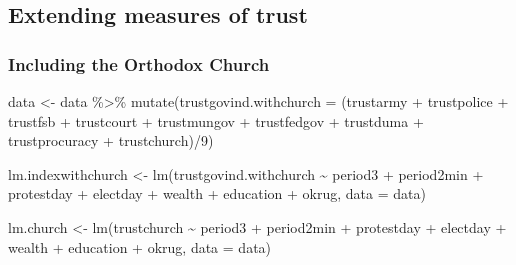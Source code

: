 \documentclass[
  letterpaper,
  DIV=11,
  numbers=noendperiod]{scrartcl}
\newenvironment{Shaded}{\begin{snugshade}}{\end{snugshade}}
\newcommand{\AttributeTok}[1]{\textcolor[rgb]{0.40,0.45,0.13}{#1}}
\newcommand{\DecValTok}[1]{\textcolor[rgb]{0.68,0.00,0.00}{#1}}
\newcommand{\FunctionTok}[1]{\textcolor[rgb]{0.28,0.35,0.67}{#1}}
\newcommand{\NormalTok}[1]{\textcolor[rgb]{0.00,0.23,0.31}{#1}}
\newcommand{\OtherTok}[1]{\textcolor[rgb]{0.00,0.23,0.31}{#1}}
\newcommand{\SpecialCharTok}[1]{\textcolor[rgb]{0.37,0.37,0.37}{#1}}
\begin{document}
\subsection{Extending measures of
trust}\label{extending-measures-of-trust}

\subsubsection{Including the Orthodox
Church}\label{including-the-orthodox-church}

\begin{Shaded}
\begin{Highlighting}[]
\NormalTok{data }\OtherTok{\textless{}{-}}\NormalTok{ data }\SpecialCharTok{\%\textgreater{}\%} 
  \FunctionTok{mutate}\NormalTok{(}\AttributeTok{trustgovind.withchurch =}\NormalTok{ (trustarmy }\SpecialCharTok{+}\NormalTok{ trustpolice }\SpecialCharTok{+}\NormalTok{ trustfsb }\SpecialCharTok{+}\NormalTok{ trustcourt }\SpecialCharTok{+} 
\NormalTok{                          trustmungov }\SpecialCharTok{+}\NormalTok{ trustfedgov }\SpecialCharTok{+}\NormalTok{ trustduma }\SpecialCharTok{+}\NormalTok{ trustprocuracy }\SpecialCharTok{+}
\NormalTok{                            trustchurch)}\SpecialCharTok{/}\DecValTok{9}\NormalTok{)}

\NormalTok{lm.indexwithchurch }\OtherTok{\textless{}{-}} \FunctionTok{lm}\NormalTok{(trustgovind.withchurch }\SpecialCharTok{\textasciitilde{}}\NormalTok{ period3 }\SpecialCharTok{+}\NormalTok{ period2min }\SpecialCharTok{+}\NormalTok{ protestday }\SpecialCharTok{+} 
\NormalTok{                           electday }\SpecialCharTok{+}\NormalTok{ wealth }\SpecialCharTok{+}\NormalTok{ education }\SpecialCharTok{+}\NormalTok{ okrug, }\AttributeTok{data =}\NormalTok{ data)}

\NormalTok{lm.church }\OtherTok{\textless{}{-}} \FunctionTok{lm}\NormalTok{(trustchurch }\SpecialCharTok{\textasciitilde{}}\NormalTok{ period3 }\SpecialCharTok{+}\NormalTok{ period2min }\SpecialCharTok{+}\NormalTok{ protestday }\SpecialCharTok{+}\NormalTok{ electday }\SpecialCharTok{+}\NormalTok{ wealth }\SpecialCharTok{+} 
\NormalTok{                  education }\SpecialCharTok{+}\NormalTok{ okrug, }\AttributeTok{data =}\NormalTok{ data)}


\end{Highlighting}
\end{Shaded}
\end{document}
